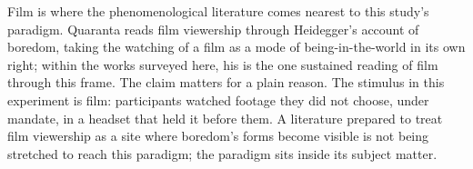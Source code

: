 Film is where the phenomenological literature comes nearest to this study's paradigm.
Quaranta reads film viewership through Heidegger's account of boredom, taking the watching of
a film as a mode of being-in-the-world in its own right; within the works surveyed here, his
is the one sustained reading of film through this frame. The claim matters for a plain
reason. The stimulus in this experiment is film: participants watched footage they did not
choose, under mandate, in a headset that held it before them. A literature prepared to treat
film viewership as a site where boredom's forms become visible is not being stretched to
reach this paradigm; the paradigm sits inside its subject matter.
